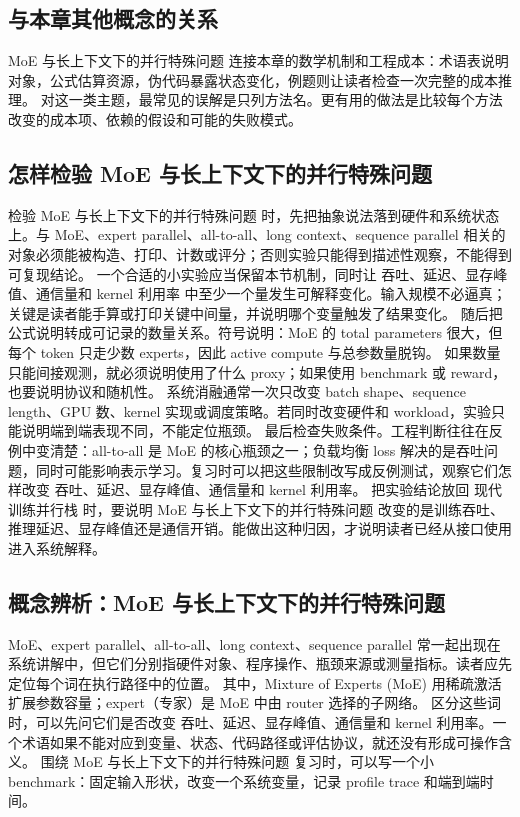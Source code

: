 \documentclass[a4paper]{article}
\begin{document}
\subsection{与本章其他概念的关系}
MoE 与长上下文下的并行特殊问题 连接本章的数学机制和工程成本：术语表说明对象，公式估算资源，伪代码暴露状态变化，例题则让读者检查一次完整的成本推理。
对这一类主题，最常见的误解是只列方法名。更有用的做法是比较每个方法改变的成本项、依赖的假设和可能的失败模式。
\subsection{怎样检验 MoE 与长上下文下的并行特殊问题}
检验 MoE 与长上下文下的并行特殊问题 时，先把抽象说法落到硬件和系统状态上。与 MoE、expert parallel、all-to-all、long context、sequence parallel 相关的对象必须能被构造、打印、计数或评分；否则实验只能得到描述性观察，不能得到可复现结论。
一个合适的小实验应当保留本节机制，同时让 吞吐、延迟、显存峰值、通信量和 kernel 利用率 中至少一个量发生可解释变化。输入规模不必逼真；关键是读者能手算或打印关键中间量，并说明哪个变量触发了结果变化。
随后把公式说明转成可记录的数量关系。符号说明：MoE 的 total parameters 很大，但每个 token 只走少数 experts，因此 active compute 与总参数量脱钩。 如果数量只能间接观测，就必须说明使用了什么 proxy；如果使用 benchmark 或 reward，也要说明协议和随机性。
系统消融通常一次只改变 batch shape、sequence length、GPU 数、kernel 实现或调度策略。若同时改变硬件和 workload，实验只能说明端到端表现不同，不能定位瓶颈。
最后检查失败条件。工程判断往往在反例中变清楚：all-to-all 是 MoE 的核心瓶颈之一；负载均衡 loss 解决的是吞吐问题，同时可能影响表示学习。复习时可以把这些限制改写成反例测试，观察它们怎样改变 吞吐、延迟、显存峰值、通信量和 kernel 利用率。
把实验结论放回 现代训练并行栈 时，要说明 MoE 与长上下文下的并行特殊问题 改变的是训练吞吐、推理延迟、显存峰值还是通信开销。能做出这种归因，才说明读者已经从接口使用进入系统解释。
\subsection{概念辨析：MoE 与长上下文下的并行特殊问题}
MoE、expert parallel、all-to-all、long context、sequence parallel 常一起出现在系统讲解中，但它们分别指硬件对象、程序操作、瓶颈来源或测量指标。读者应先定位每个词在执行路径中的位置。
其中，Mixture of Experts (MoE) 用稀疏激活扩展参数容量；expert（专家）是 MoE 中由 router 选择的子网络。
区分这些词时，可以先问它们是否改变 吞吐、延迟、显存峰值、通信量和 kernel 利用率。一个术语如果不能对应到变量、状态、代码路径或评估协议，就还没有形成可操作含义。
围绕 MoE 与长上下文下的并行特殊问题 复习时，可以写一个小 benchmark：固定输入形状，改变一个系统变量，记录 profile trace 和端到端时间。
\end{document}
